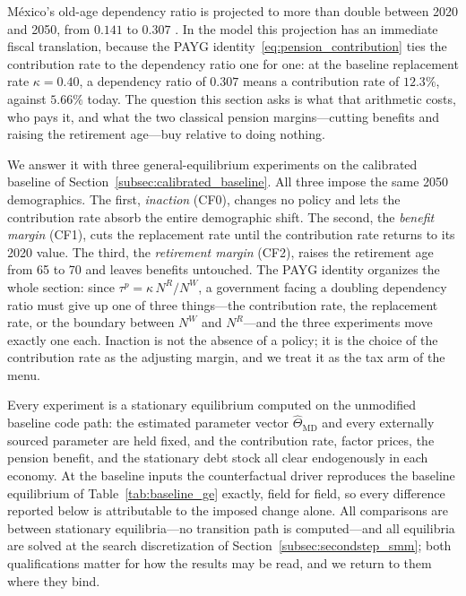 \documentclass[12pt,a4paper]{article}
\begin{document}
M\'exico's old-age dependency ratio is projected to more than double between 2020 and 2050, from $0.141$ to $0.307$ \citep{CONAPO2023}. In the model this projection has an immediate fiscal translation, because the PAYG identity~\eqref{eq:pension_contribution} ties the contribution rate to the dependency ratio one for one: at the baseline replacement rate $\kappa=0.40$, a dependency ratio of $0.307$ means a contribution rate of $12.3\%$, against $5.66\%$ today. The question this section asks is what that arithmetic costs, who pays it, and what the two classical pension margins---cutting benefits and raising the retirement age---buy relative to doing nothing.

We answer it with three general-equilibrium experiments on the calibrated baseline of Section~\ref{subsec:calibrated_baseline}. All three impose the same 2050 demographics. The first, \emph{inaction} (CF0), changes no policy and lets the contribution rate absorb the entire demographic shift. The second, the \emph{benefit margin} (CF1), cuts the replacement rate until the contribution rate returns to its 2020 value. The third, the \emph{retirement margin} (CF2), raises the retirement age from 65 to 70 and leaves benefits untouched. The PAYG identity organizes the whole section: since $\tau^p = \kappa\, N^R/N^W$, a government facing a doubling dependency ratio must give up one of three things---the contribution rate, the replacement rate, or the boundary between $N^W$ and $N^R$---and the three experiments move exactly one each. Inaction is not the absence of a policy; it is the choice of the contribution rate as the adjusting margin, and we treat it as the tax arm of the menu.

Every experiment is a stationary equilibrium computed on the unmodified baseline code path: the estimated parameter vector $\widehat\Theta_{\mathrm{MD}}$ and every externally sourced parameter are held fixed, and the contribution rate, factor prices, the pension benefit, and the stationary debt stock all clear endogenously in each economy. At the baseline inputs the counterfactual driver reproduces the baseline equilibrium of Table~\ref{tab:baseline_ge} exactly, field for field, so every difference reported below is attributable to the imposed change alone. All comparisons are between stationary equilibria---no transition path is computed---and all equilibria are solved at the search discretization of Section~\ref{subsec:secondstep_smm}; both qualifications matter for how the results may be read, and we return to them where they bind.
\end{document}
